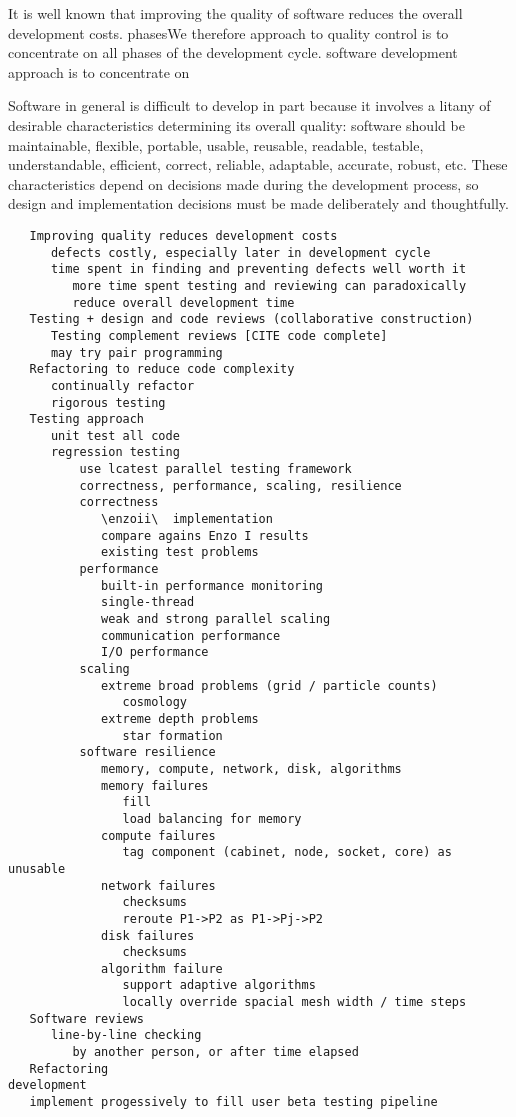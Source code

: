 \documentclass[10pt]{article}
\begin{document}
It is well known that improving the quality of software reduces the overall
development costs. 
 phasesWe therefore
approach to quality control is to concentrate on all phases of the
development cycle.  software development approach is to 
concentrate on 

Software in general is difficult to develop in part because it
involves a litany of desirable characteristics determining its overall
quality: software should be maintainable, flexible, portable,
usable, reusable, readable, testable, understandable, efficient, correct,
reliable, adaptable, accurate, robust, etc.  These characteristics
depend on decisions made during the development process, so design
and implementation decisions must be made deliberately and thoughtfully.


\begin{verbatim}
   Improving quality reduces development costs
      defects costly, especially later in development cycle
      time spent in finding and preventing defects well worth it
         more time spent testing and reviewing can paradoxically
         reduce overall development time
   Testing + design and code reviews (collaborative construction)
      Testing complement reviews [CITE code complete]
      may try pair programming
   Refactoring to reduce code complexity
      continually refactor
      rigorous testing
   Testing approach
      unit test all code
      regression testing
          use lcatest parallel testing framework
          correctness, performance, scaling, resilience
          correctness
             \enzoii\  implementation
             compare agains Enzo I results
             existing test problems
          performance
             built-in performance monitoring
             single-thread
             weak and strong parallel scaling 
             communication performance
             I/O performance
          scaling
             extreme broad problems (grid / particle counts)
                cosmology
             extreme depth problems
                star formation
          software resilience
             memory, compute, network, disk, algorithms
             memory failures
                fill
                load balancing for memory
             compute failures
                tag component (cabinet, node, socket, core) as unusable
             network failures
                checksums
                reroute P1->P2 as P1->Pj->P2
             disk failures
                checksums
             algorithm failure
                support adaptive algorithms
                locally override spacial mesh width / time steps
   Software reviews
      line-by-line checking
         by another person, or after time elapsed
   Refactoring
development
   implement progessively to fill user beta testing pipeline
\end{verbatim}
\end{document}
